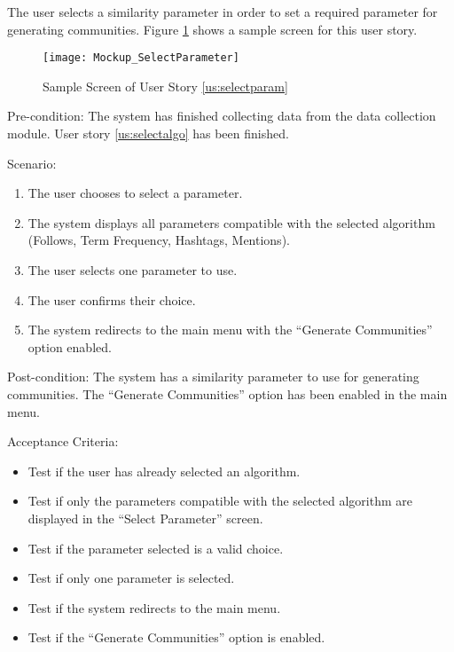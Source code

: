The user selects a similarity parameter in order to set a required parameter for generating communities. Figure \ref{fig:selectparam} shows a sample screen for this user story.


\begin{figure}[h]
	\centering
	\texttt{[image: Mockup\_SelectParameter]}
	\caption{Sample Screen of User Story \ref{us:selectparam}}
	\label{fig:selectparam}	
\end{figure}




Pre-condition: The system has finished collecting data from the data collection module. User story \ref{us:selectalgo} has been finished.




Scenario:
\begin{enumerate}
	\item The user chooses to select a parameter.
	\item The system displays all parameters compatible with the selected algorithm (Follows, Term Frequency, Hashtags, Mentions).
	\item The user selects one parameter to use.
	\item The user confirms their choice.
	\item The system redirects to the main menu with the ``Generate Communities'' option enabled.
\end{enumerate}




Post-condition: The system has a similarity parameter to use for generating communities. The ``Generate Communities'' option
has been enabled in the main menu.




Acceptance Criteria:
\begin{itemize}
	\item Test if the user has already selected an algorithm.
	\item Test if only the parameters compatible with the selected algorithm are displayed in the ``Select Parameter'' screen.
	\item Test if the parameter selected is a valid choice.
	\item Test if only one parameter is selected.
	\item Test if the system redirects to the main menu.
	\item Test if the ``Generate Communities'' option is enabled.
\end{itemize}




